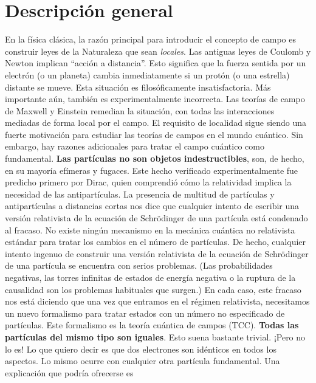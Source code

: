 \documentclass[a4paper,11pt]{book} %
\begin{document}
\section{Descripción general}
\noindent
En la física clásica, la razón principal para introducir el concepto de campo es 
construir leyes de la Naturaleza que sean \textit{locales}. Las antiguas leyes de 
Coulomb y Newton implican ``acción a distancia''. Esto significa que la fuerza 
sentida por un electrón (o un planeta) cambia inmediatamente si un protón (o una 
estrella) distante se mueve. Esta situación es filosóficamente insatisfactoria. Más 
importante aún, también es experimentalmente incorrecta. Las teorías de campo de 
Maxwell y Einstein remedian la situación, con todas las interacciones mediadas de 
forma local por el campo.
\medskip\newline
El requisito de localidad sigue siendo una fuerte motivación para estudiar las 
teorías de campos en el mundo cuántico. Sin embargo, hay razones adicionales para 
tratar el campo cuántico como fundamental.
\medskip\newline
\textbf{Las partículas no son objetos indestructibles}, son, de hecho, en su 
mayoría efímeras y fugaces. Este hecho verificado experimentalmente fue predicho 
primero por Dirac, quien comprendió cómo la relatividad implica la necesidad de las 
antipartículas.
\medskip\newline
La presencia de multitud de partículas y antipartículas a distancias cortas nos dice 
que cualquier intento de escribir una versión relativista de la ecuación de 
Schrödinger de una partícula está condenado al fracaso. No existe ningún mecanismo 
en la mecánica cuántica no relativista estándar para tratar los cambios en el número 
de partículas. De hecho, cualquier intento ingenuo de construir una versión 
relativista de la ecuación de Schrödinger de una partícula se encuentra con serios 
problemas. (Las probabilidades negativas, las torres infinitas de estados de energía 
negativa o la ruptura de la causalidad son los problemas habituales que surgen.) 
\medskip\newline
En cada caso, este fracaso nos está diciendo que una vez que entramos en el régimen 
relativista, necesitamos un nuevo formalismo para tratar estados con un número no 
especificado de partículas. Este formalismo es la teoría cuántica de campos (TCC).
\newpage\noindent
\textbf{Todas las partículas del mismo tipo son iguales}. Esto suena bastante trivial. ¡Pero no lo es! Lo que quiero decir es que dos 
electrones son idénticos en todos los aspectos. Lo mismo ocurre con cualquier otra partícula fundamental.  Una explicación que podría ofrecerse es 
\end{document}
